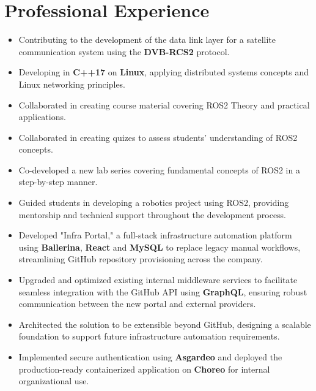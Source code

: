 \vspace{2pt}
\section{Professional Experience}
\vspace{2pt}
\resumeSubHeadingListStart
    \begin{itemize}
        \item Contributing to the development of the data link layer for a satellite communication system using the \textbf{DVB-RCS2} protocol.
        \item Developing in \textbf{C++17} on \textbf{Linux}, applying distributed systems concepts and Linux networking principles.
    \end{itemize}
    \vspace{3pt}
    \begin{itemize}
        \item Collaborated in creating course material covering ROS2 Theory and practical applications.
        \item Collaborated in creating quizes to assess students' understanding of ROS2 concepts.
        \item Co-developed a new lab series covering fundamental concepts of ROS2 in a step-by-step manner.
        \item Guided students in developing a robotics project using ROS2, providing mentorship and technical support throughout the development process.
    \end{itemize}
    \vspace{3pt}
    \begin{itemize}
        \item Developed "Infra Portal," a full-stack infrastructure automation platform using \textbf{Ballerina}, \textbf{React} and \textbf{MySQL} to replace legacy manual workflows, streamlining GitHub repository provisioning across the company.
        \item Upgraded and optimized existing internal middleware services to facilitate seamless integration with the GitHub API using \textbf{GraphQL}, ensuring robust communication between the new portal and external providers.
        \item Architected the solution to be extensible beyond GitHub, designing a scalable foundation to support future infrastructure automation requirements.
        \item Implemented secure authentication using \textbf{Asgardeo} and deployed the production-ready containerized application on \textbf{Choreo} for internal organizational use.
    \end{itemize}
\resumeSubHeadingListEnd
